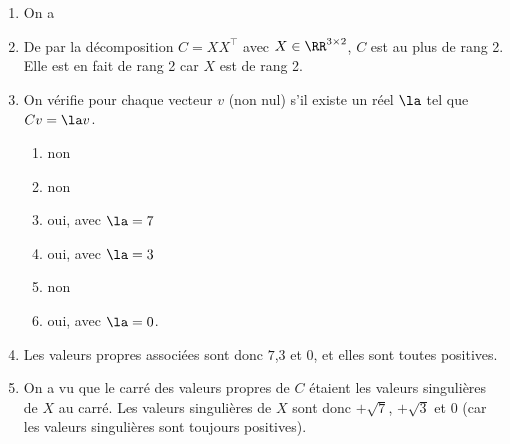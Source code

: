 \documentclass{article}
\begin{document}
\begin{enumerate}
	\item On a
	
	\item De par la décomposition $C=XX^\top$ avec $X \in \RR^{3\times 2}$, $C$ est au plus de rang 2. Elle est en fait de rang 2 car $X$ est de rang 2.
	
	\item On vérifie pour chaque vecteur $v$ (non nul) s'il existe un réel $\la$ tel que $C v = \la v$.
	\begin{enumerate}
		\item non
		\item non
		\item oui, avec $\la=7$
		\item oui, avec $\la=3$
		\item non
		\item oui, avec $\la=0$.
	\end{enumerate}

	\item Les valeurs propres associées sont donc $7$,$3$ et $0$, et elles sont toutes positives.
	
	\item On a vu que le carré des valeurs propres de $C$ étaient les valeurs singulières de $X$ au carré. Les valeurs singulières de $X$ sont donc $+\sqrt{7}$, $+\sqrt{3}$ et $0$ (car les valeurs singulières sont toujours positives).
	

\end{enumerate}
\end{document}
